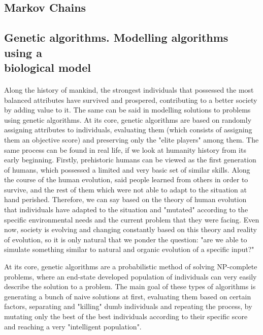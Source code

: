 \documentclass[letterpaper]{article}
\begin{document}
\subsection{Markov Chains}

\newpage

\subsection{Genetic algorithms. Modelling algorithms using a \\biological model}

\paragraph{}

Along the history of mankind, the strongest individuals that possessed the most balanced attributes have survived and prospered, contributing to a better society by adding value to it. The same can be said in modelling solutions to problems using genetic algorithms. At its core, genetic algorithms are based on randomly assigning attributes to individuals, evaluating them (which consists of assigning them an objective score) and preserving only the "elite players" among them. The same process can be found in real life, if we look at humanity history from its early beginning. Firstly, prehistoric humans can be viewed as the first generation of humans, which possessed a limited and very basic set of similar skills. Along the course of the human evolution, said people learned from others in order to survive, and the rest of them which were not able to adapt to the situation at hand perished. Therefore, we can say based on the theory of human evolution that individuals have adapted to the situation and "mutated" according to the specific environmental needs and the current problem that they were facing. Even now, society is evolving and changing constantly based on this theory and reality of evolution, so it is only natural that we ponder the question: "are we able to simulate something similar to natural and organic evolution of a specific input?"

At its core, genetic algorithms are a probabilistic method of solving NP-complete problems, where an end-state developed population of individuals can very easily describe the solution to a problem. The main goal of these types of algorithms is generating a bunch of naive solutions at first, evaluating them based on certain factors, separating and "killing" dumb individuals and repeating the process, by mutating only the best of the best individuals according to their specific score and reaching a very "intelligent population".
\end{document}
